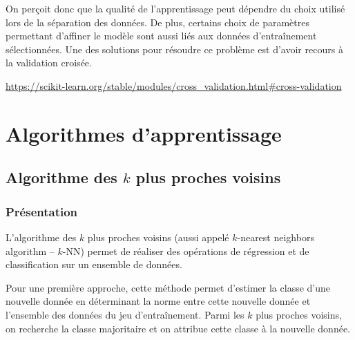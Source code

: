 On perçoit donc que la qualité de l'apprentissage peut dépendre du choix utilisé lors de la séparation des données. De plus, certains choix de paramètres permettant d’affiner le modèle sont aussi liés aux données d’entraînement sélectionnées. 
Une des solutions pour résoudre ce problème est d'avoir recours à la validation croisée. 




\url{https://scikit-learn.org/stable/modules/cross_validation.html#cross-validation}




\section{Algorithmes d'apprentissage}

\subsection{Algorithme des $k$ plus proches voisins}
\subsubsection{Présentation}
L'algorithme des  $k$ plus proches voisins (aussi appelé $k$-nearest neighbors algorithm -- $k$-NN) permet de réaliser des opérations de régression et de classification sur un ensemble de données. 

Pour une première approche, cette méthode permet d'estimer la classe d'une nouvelle donnée en déterminant la norme entre cette nouvelle donnée et l'ensemble des données du jeu d’entraînement. Parmi les $k$ plus proches voisins, on recherche la classe majoritaire et on attribue cette classe à la nouvelle donnée.  

